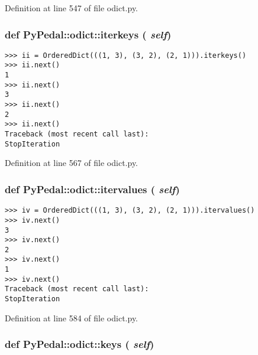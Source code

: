 Definition at line 547 of file odict.py.\hypertarget{namespacePyPedal_1_1odict_3411bc4816b0a3d26bfa2de6774514d0}{
\subsubsection{\setlength{\rightskip}{0pt plus 5cm}def PyPedal::odict::iterkeys ( {\em self})}}
\label{namespacePyPedal_1_1odict_3411bc4816b0a3d26bfa2de6774514d0}




\footnotesize\begin{verbatim}
>>> ii = OrderedDict(((1, 3), (3, 2), (2, 1))).iterkeys()
>>> ii.next()
1
>>> ii.next()
3
>>> ii.next()
2
>>> ii.next()
Traceback (most recent call last):
StopIteration
\end{verbatim}
\normalsize
 

Definition at line 567 of file odict.py.\hypertarget{namespacePyPedal_1_1odict_b3c4910ae1d33f961e861741e8c37bf5}{
\subsubsection{\setlength{\rightskip}{0pt plus 5cm}def PyPedal::odict::itervalues ( {\em self})}}
\label{namespacePyPedal_1_1odict_b3c4910ae1d33f961e861741e8c37bf5}




\footnotesize\begin{verbatim}
>>> iv = OrderedDict(((1, 3), (3, 2), (2, 1))).itervalues()
>>> iv.next()
3
>>> iv.next()
2
>>> iv.next()
1
>>> iv.next()
Traceback (most recent call last):
StopIteration
\end{verbatim}
\normalsize
 

Definition at line 584 of file odict.py.\hypertarget{namespacePyPedal_1_1odict_b5027844a4b052a1d2ee5139786d6e8c}{
\subsubsection{\setlength{\rightskip}{0pt plus 5cm}def PyPedal::odict::keys ( {\em self})}}
\label{namespacePyPedal_1_1odict_b5027844a4b052a1d2ee5139786d6e8c}




